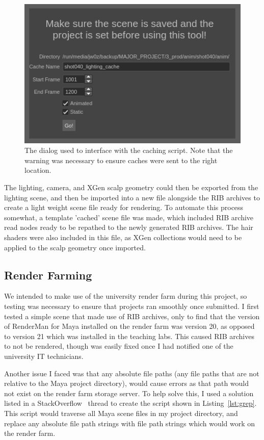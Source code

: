 \documentclass[11pt]{article}
\begin{document}
\begin{figure}[htbp]\centering
	\includegraphics[width=1.0\linewidth]{images/cache_tool.png}
	\caption{\label{figure:cache_tool} The dialog used to interface with the caching script. Note that the warning was necessary to ensure caches were sent to the right location.}
\end{figure}

The lighting, camera, and XGen scalp geometry could then be exported from the lighting scene, and then be imported into a new file alongside the RIB archives to create a light weight scene file ready for rendering. To automate this process somewhat, a template 'cached' scene file was made, which included RIB archive read nodes ready to be repathed to the newly generated RIB archives. The hair shaders were also included in this file, as XGen collections would need to be applied to the scalp geometry once imported.

\subsection{Render Farming}

We intended to make use of the university render farm during this project, so testing was necessary to ensure that projects ran smoothly once submitted. I first tested a simple scene that made use of RIB archives, only to find that the version of RenderMan for Maya installed on the render farm was version 20, as opposed to version 21 which was installed in the teaching labs. This caused RIB archives to not be rendered, though was easily fixed once I had notified one of the university IT technicians.

Another issue I faced was that any absolute file paths (any file paths that are not relative to the Maya project directory), would cause errors as that path would not exist on the render farm storage server. To help solve this, I used a solution listed in a StackOverflow~\cite{stackoverflow} thread to create the script shown in Listing~\ref{lst:grep}. This script would traverse all Maya scene files in my project directory, and replace any absolute file path strings with file path strings which would work on the render farm.
\end{document}
